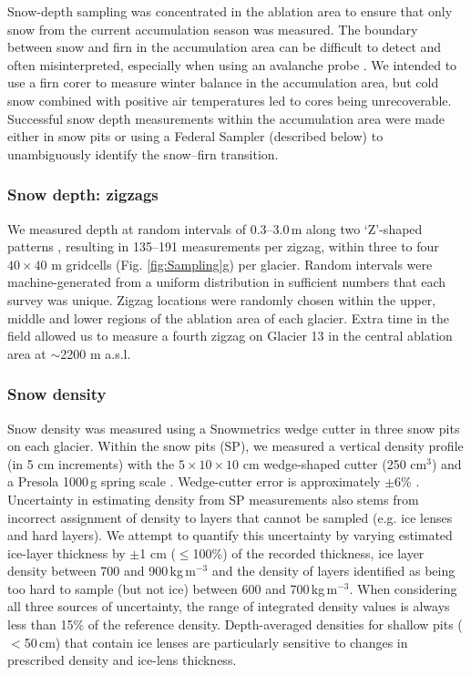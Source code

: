 \documentclass[twocolumn, letterpaper]{igs}
\begin{document}
Snow-depth sampling was concentrated in the ablation area to ensure that only snow from the current accumulation season was measured. The boundary between snow and firn in the accumulation area can be difficult to detect and often misinterpreted, especially when using an avalanche probe \citep{Grunewald2010,Sold2013}. We intended to use a firn corer to measure winter balance in the accumulation area, but cold snow combined with positive air temperatures led to cores being unrecoverable. Successful snow depth measurements within the accumulation area were made either in snow pits or using a Federal Sampler (described below) to unambiguously identify the snow--firn transition. 

\subsubsection{Snow depth: zigzags}

We measured depth at random intervals of 0.3--3.0\,m along two `Z'-shaped patterns \citep{Shea2010}, resulting in 135--191 measurements per zigzag, within three to four $40\times40$ m gridcells (Fig. \ref{fig:Sampling}g) per glacier. Random intervals were machine-generated from a uniform distribution in sufficient numbers that each survey was unique. Zigzag locations were randomly chosen within the upper, middle and lower regions of the ablation area of each glacier. Extra time in the field allowed us to measure a fourth zigzag on Glacier 13 in the central ablation area at $\sim$2200 m a.s.l. 

\subsubsection{Snow density}

Snow density was measured using a Snowmetrics wedge cutter in three snow pits on each glacier. Within the snow pits (SP), we measured a vertical density profile (in 5 cm increments) with the $5\times10\times 10$ cm wedge-shaped cutter (250 cm$^3$) and a Presola 1000\,g spring scale \citep[e.g.][]{Gray1981,Fierz2009,Kinar2015}. Wedge-cutter error is approximately $\pm$6\% \citep[e.g.][]{Proksch2016,Carroll1977}. Uncertainty in estimating density from SP measurements also stems from incorrect assignment of density to layers that cannot be sampled (e.g. ice lenses and hard layers). We attempt to quantify this uncertainty by varying estimated ice-layer thickness by $\pm$1 cm ($\leq$100\%) of the recorded thickness, ice layer density between 700 and 900\,kg\,m$^{-3}$ and the density of layers identified as being too hard to sample (but not ice) between 600 and 700\,kg\,m$^{-3}$. When considering all three sources of uncertainty, the range of integrated density values is always less than 15\% of the reference density. Depth-averaged densities for shallow pits ($<$50\,cm) that contain ice lenses are particularly sensitive to changes in prescribed density and ice-lens thickness. 
\end{document}
